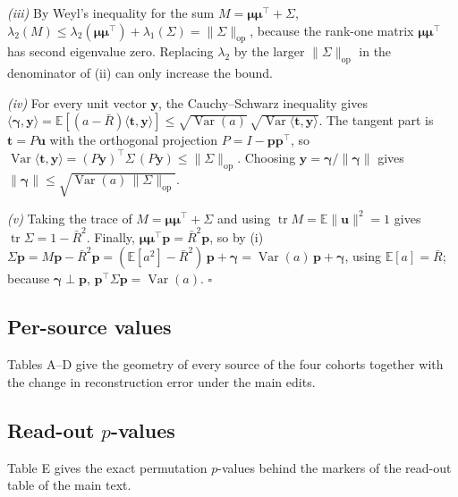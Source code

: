 \documentclass[10pt,letterpaper]{article}
\newcommand{\E}{\mathbb{E}}
\newcommand{\Rbar}{\bar{R}}
\newcommand{\anchor}{\bm{p}}
\newcommand{\uvec}{\bm{u}}
\newcommand{\tvec}{\bm{t}}
\begin{document}
\emph{(iii)} By Weyl's inequality for the sum $M=\bm{\mu}\bm{\mu}^{\top}+\Sigma$,
$\lambda_2(M)\leq\lambda_2(\bm{\mu}\bm{\mu}^{\top})+\lambda_1(\Sigma)=
\lVert\Sigma\rVert_{\mathrm{op}}$, because the rank-one matrix $\bm{\mu}\bm{\mu}^{\top}$ has
second eigenvalue zero. Replacing $\lambda_2$ by the larger
$\lVert\Sigma\rVert_{\mathrm{op}}$ in the denominator of (ii) can only increase the bound.

\emph{(iv)} For every unit vector $\bm{y}$, the Cauchy--Schwarz inequality gives
$\langle\bm{\gamma},\bm{y}\rangle=\E[(a-\Rbar)\langle\tvec,\bm{y}\rangle]
\leq\sqrt{\operatorname{Var}(a)}\,\sqrt{\operatorname{Var}\langle\tvec,\bm{y}\rangle}$. The
tangent part is $\tvec=P\uvec$ with the orthogonal projection $P=I-\anchor\anchor^{\top}$, so
$\operatorname{Var}\langle\tvec,\bm{y}\rangle=(P\bm{y})^{\top}\Sigma\,(P\bm{y})
\leq\lVert\Sigma\rVert_{\mathrm{op}}$. Choosing $\bm{y}=\bm{\gamma}/\lVert\bm{\gamma}\rVert$
gives $\lVert\bm{\gamma}\rVert\leq\sqrt{\operatorname{Var}(a)\,\lVert\Sigma\rVert_{\mathrm{op}}}$.

\emph{(v)} Taking the trace of $M=\bm{\mu}\bm{\mu}^{\top}+\Sigma$ and using
$\operatorname{tr}M=\E\lVert\uvec\rVert^{2}=1$ gives $\operatorname{tr}\Sigma=1-\Rbar^{2}$.
Finally, $\bm{\mu}\bm{\mu}^{\top}\anchor=\Rbar^{2}\anchor$, so by (i)
$\Sigma\anchor=M\anchor-\Rbar^{2}\anchor=(\E[a^{2}]-\Rbar^{2})\,\anchor+\bm{\gamma}
=\operatorname{Var}(a)\,\anchor+\bm{\gamma}$, using $\E[a]=\Rbar$; because
$\bm{\gamma}\perp\anchor$, $\anchor^{\top}\Sigma\anchor=\operatorname{Var}(a)$. \hfill$\square$

\subsection*{Per-source values}

Tables A--D give the geometry of every source of the four cohorts together with the change in
reconstruction error under the main edits.


\clearpage

\subsection*{Read-out $p$-values}

Table E gives the exact permutation $p$-values behind the markers of the read-out table of the main text.


\clearpage


\end{document}

